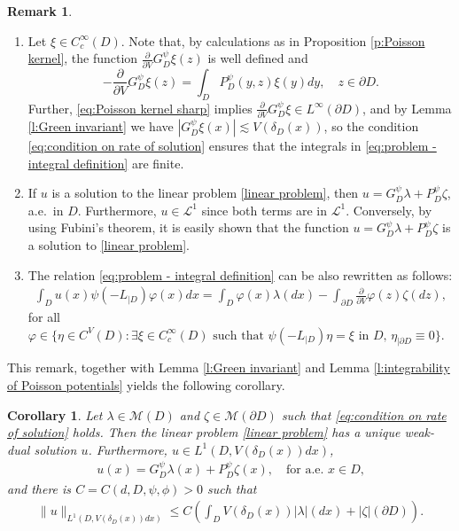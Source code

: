 \documentclass[12pt,a4paper,onecolumn]{article}
\newtheorem{cor}[thm]{Corollary}
\theoremstyle{definition}
\newtheorem{rem}[thm]{Remark}
\newcommand{\1}{\mathbf 1}
\newcommand{\de}{\delta_D}
\newcommand{\LLL}{L^1(D,V(\de(x))dx)}
\newcommand{\MM}{\mathcal{M}}
\newcommand{\calL}{\mathcal{L}^1}
\newcommand{\Lo}{\psi(-L_{|D})}
\newcommand{\GDP}{G_D^\psi}
\newcommand{\PDS}{P^{\psi}_{ D}}
\numberwithin{equation}{section}
\begin{document}
	\begin{rem}
		\begin{enumerate}[label=(\alph*)]
			\item
			Let $\xi\in C_c^\infty(D)$. Note that, by calculations as in Proposition \ref{p:Poisson kernel}, the function $\frac{\partial}{\partial V}\GDP\xi(z)$ is well defined and
            $$-\frac{\partial}{\partial V}\GDP\xi(z)=\int_D\PDS(y,z)\xi(y)dy, \quad z \in \partial D.$$
			Further, \eqref{eq:Poisson kernel sharp} implies $\frac{\partial}{\partial V}\GDP\xi\in L^\infty(\partial D)$, and by Lemma \ref{l:Green invariant} we have $|\GDP\xi(x)|\lesssim V(\de(x))$, so the condition \eqref{eq:condition on rate of solution} ensures that the integrals in \eqref{eq:problem - integral definition} are finite.
			\item
			If $u$ is a solution to the linear problem \eqref{linear problem}, then $u=\GDP\lambda+\PDS\zeta$, a.e.~in $D$. Furthermore, $u\in \calL$ since both terms are in $\calL$. Conversely, by using Fubini's theorem, it is easily shown that the function $u=\GDP\lambda+\PDS\zeta$ 
            is a solution to \eqref{linear problem}.
            \item The relation \eqref{eq:problem - integral definition} can be also rewritten as follows:
            \begin{align*}
			\int_D u(x)\Lo\varphi(x)dx=\int_D\varphi(x)\lambda(dx)-\int_{\partial D}\frac{\partial}{\partial V}\varphi(z)\zeta(dz),
		\end{align*}
        for all $\varphi\in\{\eta\in C^V(D): \exists\xi \in C_c^\infty(D)\textrm{ such that }\Lo \eta=\xi \textrm{ in $D$, } \eta_{|\partial D}\equiv 0\}.$
		\end{enumerate}
	\end{rem}

 	This remark, together with Lemma \ref{l:Green invariant} and Lemma \ref{l:integrability of Poisson potentials} yields the following corollary.
	\begin{cor}\label{t:linear problem}
		Let $\lambda\in \MM(D)$ and $\zeta\in \MM(\partial D)$ such that  
		\eqref{eq:condition on rate of solution} holds. Then the linear problem \eqref{linear problem} has a unique weak-dual solution $u$. Furthermore, $u\in\LLL$,
		\begin{align*}
			u(x)=\GDP\lambda(x)+\PDS\zeta(x),\quad\text{for a.e. $x\in D$,}
		\end{align*}
		and there is $C=C(d,D,\psi,\phi)>0$ such that
		\begin{align*}
			\|u\|_{\LLL}\le C\left(\int_DV(\de(x))|\lambda|(dx)+|\zeta|(\partial D)\right).
		\end{align*}
	\end{cor}
	
\end{document}
